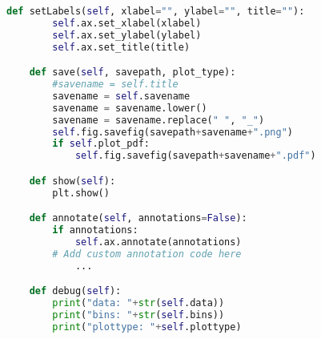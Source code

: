 \begin{lstlisting}[language=Python,caption=myplot.py]
    def setLabels(self, xlabel="", ylabel="", title=""):
        self.ax.set_xlabel(xlabel)
        self.ax.set_ylabel(ylabel)
        self.ax.set_title(title)

    def save(self, savepath, plot_type):
        #savename = self.title
        savename = self.savename
        savename = savename.lower()
        savename = savename.replace(" ", "_")
        self.fig.savefig(savepath+savename+".png")
        if self.plot_pdf:
            self.fig.savefig(savepath+savename+".pdf")

    def show(self):
        plt.show()

    def annotate(self, annotations=False):
        if annotations:
			self.ax.annotate(annotations)
		# Add custom annotation code here
			...

    def debug(self):
        print("data: "+str(self.data))
        print("bins: "+str(self.bins))
        print("plottype: "+self.plottype)

\end{lstlisting}